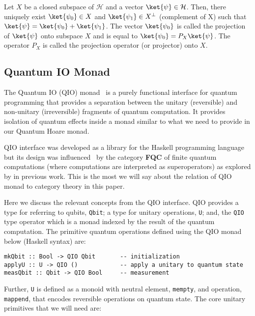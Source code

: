 \documentclass[acmsmall,nonacm,timestamp,review=false,anonymous=false]{acmart}
\begin{document}
\begin{definition}
	Let $X$ be a closed subspace of $\mathcal{H}$ and a vector $\ket{\psi} \in \mathcal{H}$. Then, there uniquely exist $\ket{\psi_0} \in X$ and $\ket{\psi_1} \in X^\bot$ (complement of X) such that $\ket{\psi} = \ket{\psi_0} + \ket{\psi_1}$. The vector $\ket{\psi_0}$ is called the projection of $\ket{\psi}$ onto subspace $X$ and is equal to $\ket{\psi_0} = P_X \ket{\psi}$. The operator $P_X$ is called the projection operator (or projector) onto $X$.
\end{definition}


\subsection{Quantum IO Monad}
\label{sec:qio}

The Quantum IO (QIO) monad~\cite{qio} is a purely functional interface for quantum programming that provides a separation between the unitary (reversible) and non-unitary (irreversible) fragments of quantum computation. It provides isolation of quantum effects inside a monad similar to what we need to provide in our Quantum Hoare monad.

QIO interface was developed as a library for the Haskell programming language but its design was influenced~\cite{asg2010} by the category \textbf{FQC} of finite quantum computations (where computations are interpreted as superoperators) as explored by \citet{fqc06} in previous work. This is the most we will say about the relation of QIO monad to category theory in this paper.

Here we discuss the relevant concepts from the QIO interface. QIO provides a type for referring to qubits, \texttt{Qbit}; a type for unitary operations, \texttt{U}; and, the \texttt{QIO} type operator which is a monad indexed by the result of the quantum computation. The primitive quantum operations defined using the QIO monad below (Haskell syntax) are:

\begin{minipage}{0.95\linewidth}
\begin{lstlisting}[language=QHaskell]
mkQbit :: Bool -> QIO Qbit       -- initialization
applyU :: U -> QIO ()            -- apply a unitary to quantum state
measQbit :: Qbit -> QIO Bool     -- measurement
\end{lstlisting}
\end{minipage}

Further, \texttt{U} is defined as a monoid with neutral element, \texttt{mempty}, and operation, \texttt{mappend}, that encodes reversible operations on quantum state. The core unitary primitives that we will need are:
\end{document}

